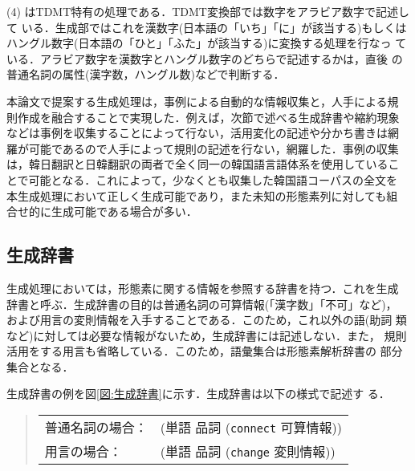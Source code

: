 (4) はTDMT特有の処理である．TDMT変換部では数字をアラビア数字で記述して
いる．生成部ではこれを漢数字(日本語の「いち」「に」が該当する)もしくは
ハングル数字(日本語の「ひと」「ふた」が該当する)に変換する処理を行なっ
ている．アラビア数字を漢数字とハングル数字のどちらで記述するかは，直後
の普通名詞の属性(漢字数，ハングル数)などで判断する．

本論文で提案する生成処理は，事例による自動的な情報収集と，人手による規
則作成を融合することで実現した．例えば，次節で述べる生成辞書や縮約現象
などは事例を収集することによって行ない，活用変化の記述や分かち書きは網
羅が可能であるので人手によって規則の記述を行ない，網羅した．事例の収集
は，韓日翻訳と日韓翻訳の両者で全く同一の韓国語言語体系を使用しているこ
とで可能となる．これによって，少なくとも収集した韓国語コーパスの全文を
本生成処理において正しく生成可能であり，また未知の形態素列に対しても組
合せ的に生成可能である場合が多い．




\subsection{生成辞書}

生成処理においては，形態素に関する情報を参照する辞書を持つ．これを生成
辞書と呼ぶ．生成辞書の目的は普通名詞の可算情報(「漢字数」「不可」など)，
および用言の変則情報を入手することである．このため，これ以外の語(助詞
類など)に対しては必要な情報がないため，生成辞書には記述しない．また，
規則活用をする用言も省略している．このため，語彙集合は形態素解析辞書の
部分集合となる．

生成辞書の例を図\ref{図:生成辞書}に示す．生成辞書は以下の様式で記述す
る．
\vspace{.5\baselineskip}

\begin{quote}
\begin{tabular}{ll}
普通名詞の場合： & (単語 品詞 ({\tt connect} 可算情報))\\
用言の場合：     & (単語 品詞 ({\tt change} 変則情報))\\
\end{tabular}
\end{quote}
\vspace{.5\baselineskip}



